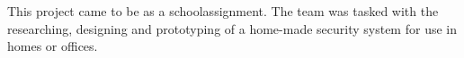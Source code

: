 This project came to be as a schoolassignment. The team was tasked with the researching, designing and prototyping of a home-made security system for use in homes or offices. \\

